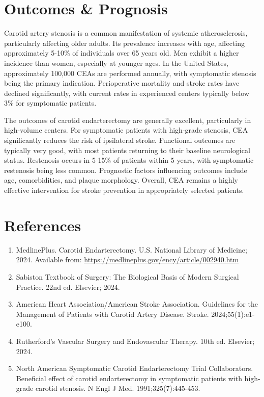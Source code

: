 \section*{Outcomes \& Prognosis}
Carotid artery stenosis is a common manifestation of systemic atherosclerosis, particularly affecting older adults. Its prevalence increases with age, affecting approximately 5-10\% of individuals over 65 years old. Men exhibit a higher incidence than women, especially at younger ages. In the United States, approximately 100,000 CEAs are performed annually, with symptomatic stenosis being the primary indication. Perioperative mortality and stroke rates have declined significantly, with current rates in experienced centers typically below 3\% for symptomatic patients.

The outcomes of carotid endarterectomy are generally excellent, particularly in high-volume centers. For symptomatic patients with high-grade stenosis, CEA significantly reduces the risk of ipsilateral stroke. Functional outcomes are typically very good, with most patients returning to their baseline neurological status. Restenosis occurs in 5-15\% of patients within 5 years, with symptomatic restenosis being less common. Prognostic factors influencing outcomes include age, comorbidities, and plaque morphology. Overall, CEA remains a highly effective intervention for stroke prevention in appropriately selected patients.

\section*{References}
\begin{enumerate}
  \item MedlinePlus. Carotid Endarterectomy. U.S. National Library of Medicine; 2024. Available from: \url{https://medlineplus.gov/ency/article/002940.htm}
  
  \item Sabiston Textbook of Surgery: The Biological Basis of Modern Surgical Practice. 22nd ed. Elsevier; 2024.
  
  \item American Heart Association/American Stroke Association. Guidelines for the Management of Patients with Carotid Artery Disease. Stroke. 2024;55(1):e1-e100.
  
  \item Rutherford's Vascular Surgery and Endovascular Therapy. 10th ed. Elsevier; 2024.
  
  \item North American Symptomatic Carotid Endarterectomy Trial Collaborators. Beneficial effect of carotid endarterectomy in symptomatic patients with high-grade carotid stenosis. N Engl J Med. 1991;325(7):445-453.
\end{enumerate}

\clearpage
